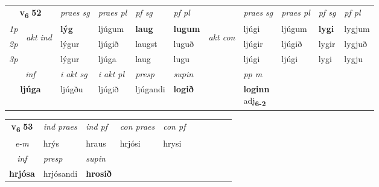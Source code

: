 \noindent
\begin{tabular}{lllllllllll} \toprule
\multicolumn{2}{c}{\textbf{v{\textsubscript{6}}} \Large{\textbf{52}}}  &  \textit{praes sg}  & \textit{praes pl}  &\textit{ pf sg} & \textit{pf pl} &  &  \textit{praes sg}  & \textit{praes pl}  & \textit{pf sg} & \textit{pf pl } \\*
	\cmidrule{3-6} \cmidrule{8-11}
 {\textit{1p}} & \multirow{3}{*}{\begin{turn}{90}\textit{akt ind}\end{turn}} & \textbf{lýg} & ljúgum & \textbf{laug} & \textbf{lugum} & \multirow{3}{*}{\begin{turn}{90}\textit{akt con}\end{turn}} &ljúgi & ljúgum & \textbf{lygi} & lygjum\\*
 {\textit{2p}} &  &  lýgur  & ljúgið & laugst & luguð & & ljúgir & ljúgið & lygir & lygjuð \\*
{\textit{3p}} &  & lýgur & ljúga & laug & lugu & & ljúgi & ljúgi& lygi & lygju \\*
\cmidrule{3-6} \cmidrule{8-11}

   \multicolumn{2}{c}{\textit{inf}}  & \textit{i akt sg} & \textit{i akt pl}   & \textit{presp} & \textit{supin}  && \textit{pp m} \\*
  \multicolumn{2}{c}{\textbf{ljúga}} & ljúgðu  & ljúgið   & ljúgandi &  \textbf{logið}  && \specialcell{\textbf{loginn} \\ adj\textbf{\textsubscript{6-2}}} \\*
\end{tabular}

\noindent
\begin{tabular}{lllllllllll} \toprule
\multicolumn{2}{c}{\textbf{v{\textsubscript{6}}} \Large{\textbf{53}}}  &  \textit{ind praes} & \textit{ind pf} & \textit{con praes} & \textit{con pf} \\*
\multicolumn{2}{c}{ \textit{e-m} } & hrýs & hraus & hrjósi & hrysi \\*

\cmidrule{3-4}
   \multicolumn{2}{c}{\textit{inf}}     & \textit{presp} & \textit{supin}   \\*
  \multicolumn{2}{c}{\textbf{hrjósa}}      & hrjósandi &  \textbf{hrosið}   \\*
\end{tabular}

